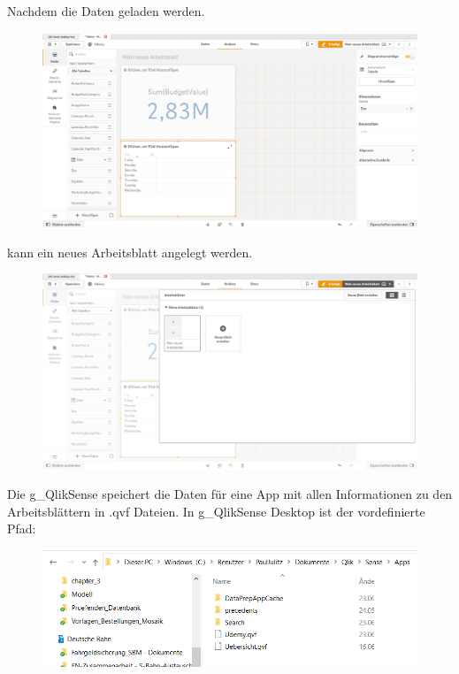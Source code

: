 Nachdem die Daten geladen werden.
\begin{figure}[H]
	\centering
	\includegraphics[scale = 0.3]{attachment/chapter_3/Scc016}
	\caption{}
	\label{fig:Scc016}
\end{figure}

kann ein neues Arbeitsblatt angelegt werden.
\begin{figure}[H]
	\centering
	\includegraphics[scale = 0.3]{attachment/chapter_3/Scc017}
	\caption{}
	\label{fig:Scc017}
\end{figure}

Die \gls{g_QlikSense} speichert die Daten für eine App mit allen Informationen zu den Arbeitsblättern in \gls{.qvf} Dateien. In \gls{g_QlikSense} Desktop ist der vordefinierte Pfad:
\begin{figure}[H]
	\centering
	\includegraphics[scale = 0.3]{attachment/chapter_3/Scc018}
	\caption{}
	\label{fig:Scc018}
\end{figure}

